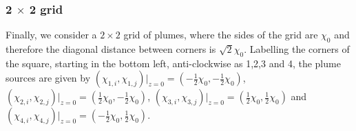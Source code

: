 \documentclass{jfm}
\begin{document}
	\subsubsection{2 $\times$ 2 grid}
	Finally, we consider a $2 \times 2$ grid of plumes, where the sides of the grid are $\chi_0$ and therefore the diagonal distance between corners is $\sqrt{2}\chi_0$. Labelling the corners of the square, starting in the bottom left, anti-clockwise as 1,2,3 and 4, the plume sources are given by $\displaystyle{\left(\chi_{1,i},\chi_{1,j}\right)\vert_{z=0} = \left(-\frac{1}{2}\chi_0,-\frac{1}{2}\chi_0\right)}$, $\displaystyle{\left(\chi_{2,i},\chi_{2,j}\right)\vert_{z=0} = \left(\frac{1}{2}\chi_0,-\frac{1}{2}\chi_0\right)}$, $\displaystyle{\left(\chi_{3,i},\chi_{3,j}\right)\vert_{z=0} = \left(\frac{1}{2}\chi_0,\frac{1}{2}\chi_0\right)}$ and $\displaystyle{\left(\chi_{4,i},\chi_{4,j}\right)\vert_{z = 0} = \left(-\frac{1}{2}\chi_0,\frac{1}{2}\chi_0\right)}$.\\
	
\end{document}
